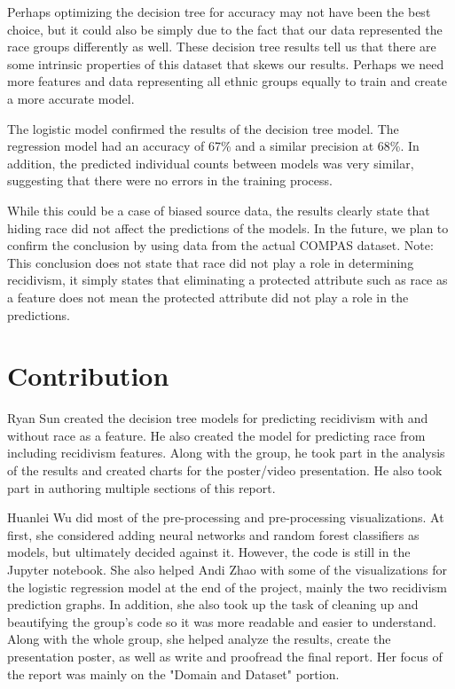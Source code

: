 \documentclass[11pt, sigconf]{acmart}
\begin{document}
Perhaps optimizing the decision tree for accuracy may not have been the best choice, but it could also be simply due to the fact that our data represented the race groups differently as well. These decision tree results tell us that there are some intrinsic properties of this dataset that skews our results. Perhaps we need more features and data representing all ethnic groups equally to train and create a more accurate model. 

The logistic model confirmed the results of the decision tree model. The regression model had an accuracy of 67\% and a similar precision at 68\%. In addition, the predicted individual counts between models was very similar, suggesting that there were no errors in the training process. 

While this could be a case of biased source data, the results clearly state that hiding race did not affect the predictions of the models. In the future, we plan to confirm the conclusion by using data from  the actual COMPAS dataset. Note: This conclusion does not state that race did not play a role in determining recidivism, it simply states that eliminating a protected attribute such as race as a feature does not mean the protected attribute did not play a role in the predictions.

\section{Contribution}

\hspace{5mm}Ryan Sun created the decision tree models for predicting recidivism with and without race as a feature. He also created the model for predicting race from including recidivism features. Along with the group, he took part in the analysis of the results and created charts for the poster/video presentation. He also took part in authoring multiple sections of this report. 

Huanlei Wu did most of the pre-processing and pre-processing visualizations. At first, she considered adding neural networks and random forest classifiers as models, but ultimately decided against it. However, the code is still in the Jupyter notebook. She also helped Andi Zhao with some of the visualizations for the logistic regression model at the end of the project, mainly the two recidivism prediction graphs. In addition, she also took up the task of cleaning up and beautifying the group's code so it was more readable and easier to understand. Along with the whole group, she helped analyze the results, create the presentation poster, as well as write and proofread the final report. Her focus of the report was mainly on the "Domain and Dataset" portion. 
\end{document}
